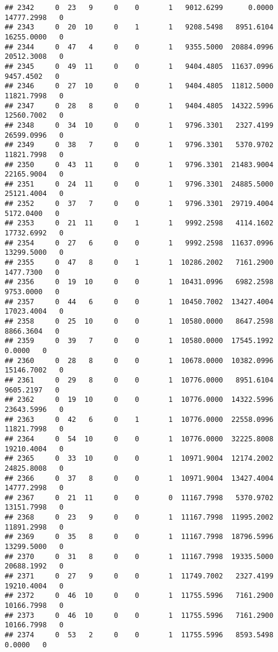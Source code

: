 \documentclass[
]{article}
\begin{document}
\begin{enumerate}
\begin{verbatim}
## 2342     0  23   9     0    0       1   9012.6299      0.0000  14777.2998   0
## 2343     0  20  10     0    1       1   9208.5498   8951.6104  16255.0000   0
## 2344     0  47   4     0    0       1   9355.5000  20884.0996  20512.3008   0
## 2345     0  49  11     0    0       1   9404.4805  11637.0996   9457.4502   0
## 2346     0  27  10     0    0       1   9404.4805  11812.5000  11821.7998   0
## 2347     0  28   8     0    0       1   9404.4805  14322.5996  12560.7002   0
## 2348     0  34  10     0    0       1   9796.3301   2327.4199  26599.0996   0
## 2349     0  38   7     0    0       1   9796.3301   5370.9702  11821.7998   0
## 2350     0  43  11     0    0       1   9796.3301  21483.9004  22165.9004   0
## 2351     0  24  11     0    0       1   9796.3301  24885.5000  25121.4004   0
## 2352     0  37   7     0    0       1   9796.3301  29719.4004   5172.0400   0
## 2353     0  21  11     0    1       1   9992.2598   4114.1602  17732.6992   0
## 2354     0  27   6     0    0       1   9992.2598  11637.0996  13299.5000   0
## 2355     0  47   8     0    1       1  10286.2002   7161.2900   1477.7300   0
## 2356     0  19  10     0    0       1  10431.0996   6982.2598   9753.0000   0
## 2357     0  44   6     0    0       1  10450.7002  13427.4004  17023.4004   0
## 2358     0  25  10     0    0       1  10580.0000   8647.2598   8866.3604   0
## 2359     0  39   7     0    0       1  10580.0000  17545.1992      0.0000   0
## 2360     0  28   8     0    0       1  10678.0000  10382.0996  15146.7002   0
## 2361     0  29   8     0    0       1  10776.0000   8951.6104   9605.2197   0
## 2362     0  19  10     0    0       1  10776.0000  14322.5996  23643.5996   0
## 2363     0  42   6     0    1       1  10776.0000  22558.0996  11821.7998   0
## 2364     0  54  10     0    0       1  10776.0000  32225.8008  19210.4004   0
## 2365     0  33  10     0    0       1  10971.9004  12174.2002  24825.8008   0
## 2366     0  37   8     0    0       1  10971.9004  13427.4004  14777.2998   0
## 2367     0  21  11     0    0       0  11167.7998   5370.9702  13151.7998   0
## 2368     0  23   9     0    0       1  11167.7998  11995.2002  11891.2998   0
## 2369     0  35   8     0    0       1  11167.7998  18796.5996  13299.5000   0
## 2370     0  31   8     0    0       1  11167.7998  19335.5000  20688.1992   0
## 2371     0  27   9     0    0       1  11749.7002   2327.4199  19210.4004   0
## 2372     0  46  10     0    0       1  11755.5996   7161.2900  10166.7998   0
## 2373     0  46  10     0    0       1  11755.5996   7161.2900  10166.7998   0
## 2374     0  53   2     0    0       1  11755.5996   8593.5498      0.0000   0

\end{verbatim}
\end{enumerate}
\end{document}
